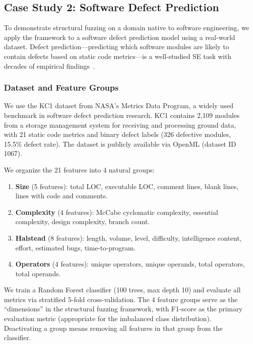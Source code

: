 \documentclass[manuscript,review,anonymous]{acmart}
\begin{document}
\subsection{Case Study 2: Software Defect Prediction}
\label{sec:defect}

To demonstrate structural fuzzing on a domain native to software engineering, we apply the framework to a software defect prediction model using a real-world dataset.
Defect prediction---predicting which software modules are likely to contain defects based on static code metrics---is a well-studied SE task with decades of empirical findings~\cite{menzies2007,zimmermann2009,hall2012}.

\subsubsection{Dataset and Feature Groups}

We use the KC1 dataset from NASA's Metrics Data Program, a widely used benchmark in software defect prediction research.
KC1 contains 2{,}109 modules from a storage management system for receiving and processing ground data, with 21 static code metrics and binary defect labels (326 defective modules, 15.5\% defect rate).
The dataset is publicly available via OpenML (dataset ID 1067).

We organize the 21 features into 4 natural groups:

\begin{enumerate}
    \item[$g_1$:] \textbf{Size} (5 features): total LOC, executable LOC, comment lines, blank lines, lines with code and comments.
    \item[$g_2$:] \textbf{Complexity} (4 features): McCabe cyclomatic complexity, essential complexity, design complexity, branch count.
    \item[$g_3$:] \textbf{Halstead} (8 features): length, volume, level, difficulty, intelligence content, effort, estimated bugs, time-to-program.
    \item[$g_4$:] \textbf{Operators} (4 features): unique operators, unique operands, total operators, total operands.
\end{enumerate}

We train a Random Forest classifier (100 trees, max depth 10) and evaluate all metrics via stratified 5-fold cross-validation.
The 4 feature groups serve as the ``dimensions'' in the structural fuzzing framework, with F1-score as the primary evaluation metric (appropriate for the imbalanced class distribution).
Deactivating a group means removing all features in that group from the classifier.
\end{document}

